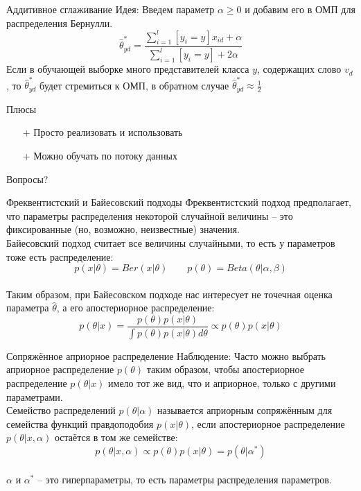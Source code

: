 \documentclass[10pt]{beamer}
\begin{document}
{
\begin{frame} {Аддитивное сглаживание}
  \alert{Идея}: Введем параметр $\alpha \geq 0$ и добавим его в ОМП для распределения Бернулли.\\
  $$\hat{\theta}_{yd}^* = \frac{\sum\limits_{i=1}^{l} [y_i = y] x_{id} + \alpha}{\sum\limits_{i=1}^{l} [y_i = y] + 2 \alpha}$$
  \bigbreak
  Если в обучающей выборке много представителей класса $y$, содержащих слово $v_d$, то $\hat{\theta}_{yd}^*$ будет стремиться к ОМП, в обратном случае $\hat{\theta}_{yd}^* \approx \frac{1}{2}$
\end{frame}
}

\begin{frame}{Плюсы}
  \begin{itemize} [<+->]
    \item[+] Просто реализовать и использовать
    \item[+] Можно обучать по потоку данных
  \end{itemize}
\end{frame}

\begin{frame}[standout]
  Вопросы?
\end{frame}

\appendix

\begin{frame} {Фреквентистский и Байесовский подходы}
  Фреквентистский подход предполагает, что параметры распределения некоторой случайной величины -- это фиксированные (но, возможно, неизвестные) значения.\\
  \pause
  \bigbreak
  Байесовский подход считает все величины случайными, то есть у параметров тоже есть распределение:\\
  $$p(x|\theta) = Ber(x|\theta) \qquad p(\theta) = Beta(\theta|\alpha, \beta)$$\\
  Таким образом, при Байесовском подходе нас интересует не точечная оценка параметра $\hat{\theta}$, а его апостериорное распределение:\\
  \pause
  $$p(\theta|x) = \frac{p(\theta) p(x|\theta)}{\int p(\theta) p(x|\theta) d\theta} \propto p(\theta) p(x|\theta) $$
\end{frame}

\begin{frame}{Сопряжённое априорное распределение}
  \alert{Наблюдение}: Часто можно выбрать априорное распределение $p(\theta)$ таким образом, чтобы апостериорное распределение $p(\theta|x)$ имело тот же вид, что и априорное, только с другими параметрами.\\
  \bigbreak
  \pause
  Семейство распределений $p(\theta|\alpha)$ называется априорным сопряжённым для семейства функций правдоподобия $p(x|\theta)$, если апостериорное распределение $p(\theta|x, \alpha)$ остаётся в том же семействе:\\
  $$p(\theta|x, \alpha) \propto p(\theta) p(x|\theta)  = p(\theta|\alpha^*)$$\\
  \bigbreak
  $\alpha$ и $\alpha^*$ -- это \alert{гипер}параметры, то есть параметры распределения параметров.
\end{frame}
\end{document}
